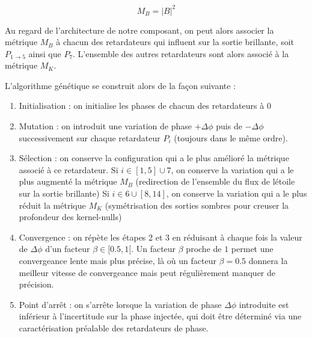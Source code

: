 \documentclass{aa}
\begin{document}
            \begin{equation}
                M_B = |B|^2
            \end{equation}
            
            Au regard de l'architecture de notre composant, on peut alors associer la métrique $M_B$ à chacun des retardateurs qui influent sur la sortie brillante, soit $P_{1 \rightarrow 5}$ ainsi que $P_7$. L'ensemble des autres retardateurs sont alors associé à la métrique $M_K$.

            L'algorithme génétique se construit alors de la façon suivante :

            \begin{enumerate}
                \item Initialisation : on initialise les phases de chacun des retardateurs à 0
                \item Mutation : on introduit une variation de phase $+ \Delta \phi$ puis de $- \Delta \phi$ successivement sur chaque retardateur $P_i$ (toujours dans le même ordre).
                \item Sélection : on conserve la configuration qui a le plus amélioré la métrique associé à ce retardateur.
                    \subitem Si $i \in [1, 5] \cup 7$, on conserve la variation qui a le plus augmenté la métrique $M_B$ (redirection de l'ensemble du flux de létoile sur la sortie brillante)
                    \subitem Si $i \in 6 \cup [8, 14]$, on conserve la variation qui a le plus réduit la métrique $M_K$ (symétrisation des sorties sombres pour creuser la profondeur des kernel-nulls)
                \item Convergence : on répète les étapes 2 et 3 en réduisant à chaque fois la valeur de $\Delta \phi$ d'un facteur $\beta \in [0.5,1[$. Un facteur $\beta$ proche de $1$ permet une convergeance lente mais plus précise, là où un facteur $\beta = 0.5$ donnera la meilleur vitesse de convergeance mais peut régulièrement manquer de précision.
                \item Point d'arrêt : on s'arrête lorsque la variation de phase $\Delta \phi$ introduite est inférieur à l'incertitude sur la phase injectée, qui doit être déterminé via une caractérisation préalable des retardateurs de phase.
            \end{enumerate}
\end{document}
